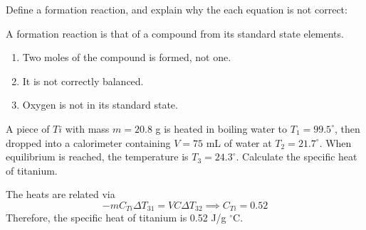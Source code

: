 \documentclass[answers]{exam}
\begin{document}
\begin{questions}
\bigskip
\question Define a formation reaction, and explain why the each equation is not correct:
%
\begin{solutionbox}{1.1in}
  A formation reaction is that of a compound from its standard state elements.
  \begin{enumerate}
    \item Two moles of the compound is formed, not one.
    \item It is not correctly balanced.
    \item Oxygen is not in its standard state.
  \end{enumerate}
\end{solutionbox}

\bigskip
\question A piece of $Ti$ with mass $m = 20.8$ g is heated in boiling water to $T_1 = 99.5^\circ$, then dropped into a calorimeter containing $V = 75$ mL of water at $T_2 = 21.7^\circ$. When equilibrium is reached, the temperature is $T_3 = 24.3^\circ$. Calculate the specific heat of titanium.
%
\begin{solutionbox}{1in}
  The heats are related via \begin{equation*}
    - m C_{Ti} \Delta T_{31} = V C \Delta T_{32} \implies C_{Ti} = 0.52
  \end{equation*}
  Therefore, the specific heat of titanium is 0.52 J/g $^\circ$C.
\end{solutionbox}


\end{questions}
\end{document}
